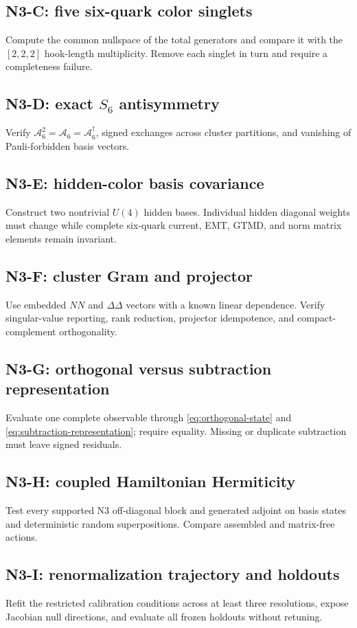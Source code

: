 \documentclass[11pt]{article}
\newcommand{\cA}{\mathcal A}
\begin{document}
\subsection*{N3-C: five six-quark color singlets}
Compute the common nullspace of the total generators and compare it with the \([2,2,2]\) hook-length multiplicity.  Remove each singlet in turn and require a completeness failure.

\subsection*{N3-D: exact \(S_6\) antisymmetry}
Verify \(\cA_6^2=\cA_6=\cA_6^\dagger\), signed exchanges across cluster partitions, and vanishing of Pauli-forbidden basis vectors.

\subsection*{N3-E: hidden-color basis covariance}
Construct two nontrivial \(U(4)\) hidden bases.  Individual hidden diagonal weights must change while complete six-quark current, EMT, GTMD, and norm matrix elements remain invariant.

\subsection*{N3-F: cluster Gram and projector}
Use embedded \(NN\) and \(\Delta\Delta\) vectors with a known linear dependence.  Verify singular-value reporting, rank reduction, projector idempotence, and compact-complement orthogonality.

\subsection*{N3-G: orthogonal versus subtraction representation}
Evaluate one complete observable through \cref{eq:orthogonal-state} and \cref{eq:subtraction-representation}; require equality.  Missing or duplicate subtraction must leave signed residuals.

\subsection*{N3-H: coupled Hamiltonian Hermiticity}
Test every supported N3 off-diagonal block and generated adjoint on basis states and deterministic random superpositions.  Compare assembled and matrix-free actions.

\subsection*{N3-I: renormalization trajectory and holdouts}
Refit the restricted calibration conditions across at least three resolutions, expose Jacobian null directions, and evaluate all frozen holdouts without retuning.
\end{document}
